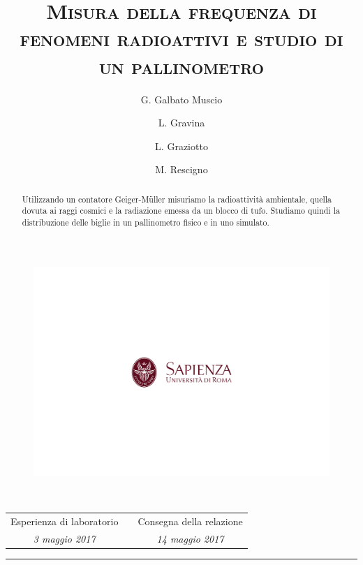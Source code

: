 \documentclass[10pt,oneside,a4paper]{article}
\title{\textsc{Misura della frequenza di fenomeni radioattivi e studio di un pallinometro}}
\author{\small{G. Galbato Muscio} \and \small{L. Gravina} \and \small{L. Graziotto} \and \small{M. Rescigno}}
\date{}
\begin{document}
	\begin{figure}
		\centering
		\includegraphics[scale=0.5, trim={2.8cm 8.9cm 0 9cm}, clip]{logo.png}
	\end{figure}
	\maketitle
	\begin{center} 
		 \\
		\vspace{1cm}
		\begin{tabular}{ccc}
			Esperienza di laboratorio && Consegna della relazione \\
			\emph{\small{3 maggio 2017}} && \emph{\small{14 maggio 2017}} \\
		\end{tabular} 
		
		\vspace{0.5cm}
		
	\end{center}
\hrule
\vspace{0.5cm}
\begin{abstract}
Utilizzando un contatore Geiger-Müller misuriamo la radioattività ambientale, quella dovuta ai raggi cosmici e la radiazione emessa da un blocco di tufo. Studiamo quindi la distribuzione delle biglie in un pallinometro fisico e in uno simulato.	
\end{abstract}
\newpage
\tableofcontents %
\listoftables %
\listoffigures %
\pagebreak
\end{document}
